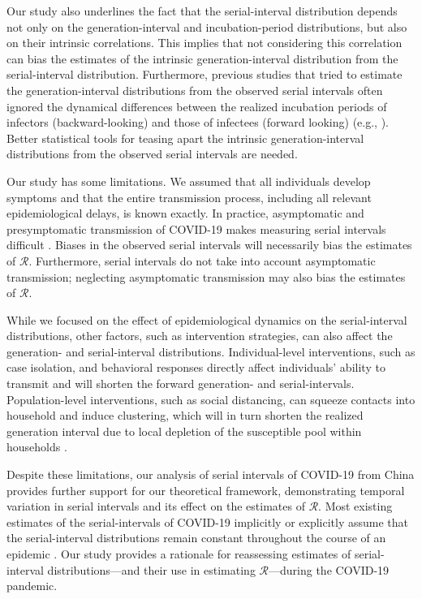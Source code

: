 \documentclass[12pt]{article}
\newcommand{\RR}{\ensuremath{{\mathcal R}}\xspace}
\begin{document}
Our study also underlines the fact that the serial-interval distribution depends not only on the generation-interval and incubation-period distributions, but also on their intrinsic correlations.
This implies that not considering this correlation can bias the estimates of the intrinsic generation-interval distribution from the serial-interval distribution.
Furthermore, previous studies that tried to estimate the generation-interval distributions from the observed serial intervals often ignored the dynamical differences between the realized incubation periods of infectors (backward-looking) and those of infectees (forward looking) (e.g., \cite{klinkenberg2011correlation, ganyani2020estimating}).
Better statistical tools for teasing apart the intrinsic generation-interval distributions from the observed serial intervals are needed.

Our study has some limitations.
We assumed that all individuals develop symptoms and that the entire transmission process, including all relevant epidemiological delays, is known exactly.
In practice, asymptomatic and presymptomatic transmission of COVID-19 makes measuring serial intervals difficult \citep{bai2020presumed,he2020temporal,wei2020presymptomatic}.
Biases in the observed serial intervals will necessarily bias the estimates of \RR. 
Furthermore, serial intervals do not take into account asymptomatic transmission; 
neglecting asymptomatic transmission may also bias the estimates of \RR \citep{park2020time}.

While we focused on the effect of epidemiological dynamics on the serial-interval distributions, other factors, such as intervention strategies, can also affect the generation- and serial-interval distributions.
Individual-level interventions, such as case isolation, and behavioral responses directly affect individuals' ability to transmit and will shorten the forward generation- and serial-intervals.
Population-level interventions, such as social distancing, can squeeze contacts into household and induce clustering, which will in turn shorten the realized generation interval due to local depletion of the susceptible pool within households \citep{park2019inferring}.

Despite these limitations, our analysis of serial intervals of COVID-19 from China provides further support for our theoretical framework, demonstrating temporal variation in serial intervals and its effect on the estimates of \RR.
Most existing estimates of the serial-intervals of COVID-19 implicitly or explicitly assume that the serial-interval distributions remain constant throughout the course of an epidemic \citep{du2020serial, he2020temporal, nishiura2020serial,tindale2020transmission,zhao2020estimating,zhang2020evolving}.
Our study provides a rationale for reassessing estimates of
serial-interval distributions---and their use in estimating
\RR---during the COVID-19 pandemic.
\end{document}
